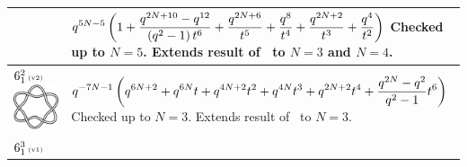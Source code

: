 \documentclass{compositio}
\theoremstyle{definition}
\numberwithin{equation}{section}
\begin{document}
{\begin{longtable}{p{}|p{}}
& 
\newline
$
\displaystyle{%
q^{5 N-5} \left(1+\frac{q^{2N+10}-q^{12}}{\left(q^2-1\right) t^6}+\frac{q^{2 N+6}}{t^5}+\frac{q^8}{t^4}+\frac{q^{2 N+2}}{t^3}+\frac{q^4}{t^2}\right)
}
$
\newline\newline\newline
Checked up to $N=5$. Extends result of~\cite{r0508510} to $N=3$ and $N=4$. 
\\
\hline
$6_{1}^2\,\text{{\tiny (v2)}}$ 
\includegraphics[scale=0.07,angle=0]{link6_1_2.pdf} 
& 
\newline
$
\displaystyle{%
q^{-7 N-1} \left(q^{6 N+2}+q^{6 N} t+q^{4 N+2} t^2+q^{4 N} t^3+q^{2 N+2} t^4+\frac{q^{2 N} -q^2 }{q^2-1} t^6\right)
}
$
\newline\newline\newline
Checked up to $N=3$. Extends result of~\cite{r0508510} to $N=3$.
\\
\hline
$6_{1}^3\,\text{{\tiny (v1)}}$ 

\end{longtable}}
\end{document}
